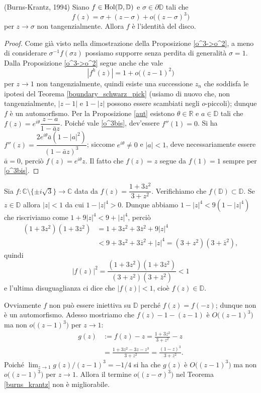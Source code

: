 \begin{thm} \label{burns_krantz}
  (Burns-Krantz, 1994) Siano $f \in \text{\normalfont{Hol}}(\mathbb{D},\mathbb{D})$ e $\sigma \in \partial\mathbb{D}$ tali che
  \begin{equation} \label{o^3bis}
    f(z)=\sigma+(z-\sigma)+o\bigl((z-\sigma)^3\bigr)
  \end{equation}
  per $z \longrightarrow \sigma$ non tangenzialmente. Allora $f$ è l'identità del disco.
\end{thm}

\begin{proof}
  Come già visto nella dimostrazione della Proposizione \ref{o^3->o^2}, a meno di considerare $\sigma^{-1}f(\sigma z)$ possiamo supporre senza perdita di generalità $\sigma=1$.
  Dalla Proposizione \ref{o^3->o^2} segue anche che vale
  $$|f^h(z)|=1+o\bigl((z-1)^2\bigr)$$
  per $z \longrightarrow 1$ non tangenzialmente, quindi esiste una successione $z_n$ che soddisfa le ipotesi del Teorema \ref{boundary_schwarz_pick} (usiamo di nuovo che, non tangenzialmente, $|z-1|$ e $1-|z|$ possono essere scambiati negli $o$-piccoli); dunque $f$ è un automorfismo.
  Per la Proposizione \ref{aut} esistono $\theta \in \mathbb{R}$ e $a \in \mathbb{D}$ tali che $f(z)=e^{i\theta}\dfrac{z-a}{1-\bar{a}z}$. Poiché vale \eqref{o^3bis}, dev'essere $f''(1)=0$. Si ha $f''(z)=\dfrac{2e^{i\theta}\bar{a}(1-|a|^2)}{(1-\bar{a}z)^3}$;
  siccome $e^{i\theta}\not=0$ e $|a|<1$, deve necessariamente essere $\bar{a}=0$, perciò $f(z)=e^{i\theta}z$. Il fatto che $f(z)=z$ segue da $f(1)=1$ sempre per \eqref{o^3bis}.
\end{proof}

\begin{ex}
  Sia $f:\mathbb{C}\setminus\{\pm i\sqrt{3}\} \longrightarrow \mathbb{C}$ data da $f(z)=\dfrac{1+3z^2}{3+z^2}$. Verifichiamo che $f(\mathbb{D}) \subset \mathbb{D}$. Se $z \in \mathbb{D}$ allora $|z|<1$ da cui $1-|z|^4>0$.
  Dunque abbiamo $1-|z|^4 < 9(1-|z|^4)$ che riscriviamo come $1+9|z|^4 < 9+|z|^4$, perciò
  \begin{align*}
    (1+3z^2)(1+3\bar{z}^2) &=1+3z^2+3\bar{z}^2+9|z|^4 \\
    & < 9+3z^2+3\bar{z}^2+|z|^4=(3+z^2)(3+\bar{z}^2),
  \end{align*}
  quindi
  $$|f(z)|^2=\frac{(1+3z^2)(1+3\bar{z}^2)}{(3+z^2)(3+\bar{z}^2)} < 1$$
  e l'ultima disuguaglianza ci dice che $|f(z)|<1$, cioè $f(z) \in \mathbb{D}$.

  Ovviamente $f$ non può essere iniettiva su $\mathbb{D}$ perché $f(z)=f(-z)$; dunque non è un automorfismo. Adesso mostriamo che $f(z)-1-(z-1)$ è $O\bigl((z-1)^3\bigr)$ ma non $o\bigl((z-1)^3\bigr)$ per $z \longrightarrow 1$:
  \begin{align*}
    g(z) & := f(z)-z=\frac{1+3z^2}{3+z^2}-z \\
    & =\frac{1+3z^2-3z-z^3}{3+z^2}=\frac{(1-z)^3}{3+z^2}.
  \end{align*}
  Poiché $\displaystyle \lim_{z \longrightarrow 1} g(z)/(z-1)^3=-1/4$ si ha che $g(z)$ è $O\bigl((z-1)^3\bigr)$ ma non $o\bigl((z-1)^3\bigr)$ per $z \longrightarrow 1$. Allora il termine $o\bigl((z-\sigma)^3\bigr)$ nel Teorema \ref{burns_krantz} non è migliorabile.
\end{ex}

